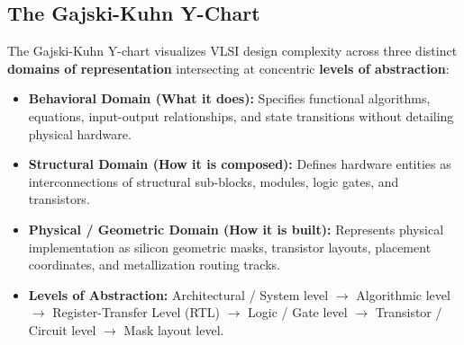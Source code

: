 \documentclass[12pt,a4paper]{article}
\begin{document}
\subsection{The Gajski-Kuhn Y-Chart}
The Gajski-Kuhn Y-chart visualizes VLSI design complexity across three distinct \textbf{domains of representation} intersecting at concentric \textbf{levels of abstraction}:
\begin{itemize}[leftmargin=*, itemsep=3pt]
  \item \textbf{Behavioral Domain (What it does):} Specifies functional algorithms, equations, input-output relationships, and state transitions without detailing physical hardware.
  \item \textbf{Structural Domain (How it is composed):} Defines hardware entities as interconnections of structural sub-blocks, modules, logic gates, and transistors.
  \item \textbf{Physical / Geometric Domain (How it is built):} Represents physical implementation as silicon geometric masks, transistor layouts, placement coordinates, and metallization routing tracks.
  \item \textbf{Levels of Abstraction:} Architectural / System level $\to$ Algorithmic level $\to$ Register-Transfer Level (RTL) $\to$ Logic / Gate level $\to$ Transistor / Circuit level $\to$ Mask layout level.
\end{itemize}
\end{document}
